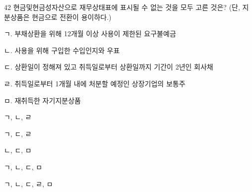 \begin{question}{42}
현금및현금성자산으로 재무상태표에 표시될 수 없는 것을 모두 고른 것은? (단, 지분상품은 현금으로 전환이 용이하다.)
\begin{framedtext}
ㄱ. 부채상환을 위해 12개월 이상 사용이 제한된 요구불예금 \par
ㄴ. 사용을 위해 구입한 수입인지와 우표 \par
ㄷ. 상환일이 정해져 있고 취득일로부터 상환일까지 기간이 2년인 회사채 \par
ㄹ. 취득일로부터 1개월 내에 처분할 예정인 상장기업의 보통주 \par
ㅁ. 재취득한 자기지분상품 \par
\end{framedtext}
\begin{choices}
  \item ㄱ, ㄴ, ㄹ
  \item ㄱ, ㄷ, ㄹ
  \item ㄴ, ㄷ, ㅁ
  \item ㄱ, ㄴ, ㄷ, ㅁ
  \item ㄱ, ㄴ, ㄷ, ㄹ, ㅁ
\end{choices}
\end{question}
